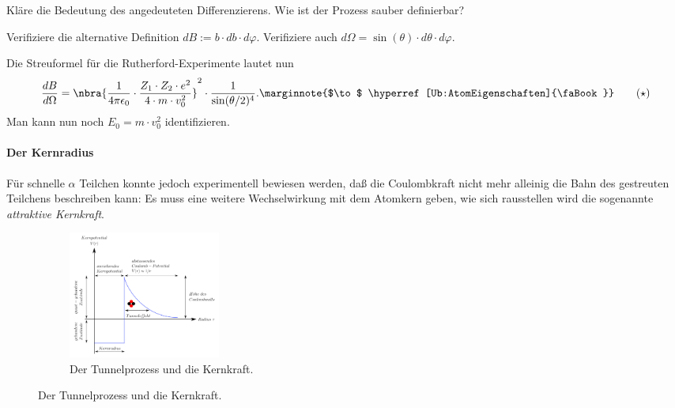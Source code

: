 \documentclass{subfiles}
\begin{document}
    \begin{Aufgabe}
        \nr{} Kläre die Bedeutung des angedeuteten Differenzierens. Wie ist der Prozess sauber definierbar?

        \nr{} Verifiziere die alternative Definition $dB:=b\cdot db\cdot d\varphi$. Verifiziere auch $d\Omega=\sin(\theta) \cdot d\theta\cdot d\varphi$. 
    \end{Aufgabe}

    \noindent Die Streuformel für die Rutherford-Experimente lautet nun
    \begin{align}
        \frac{dB}{d\Omega} = \nbra{\frac{1}{4\pi\epsilon_0}\cdot\frac{Z_1\cdot Z_2\cdot e^2}{4\cdot m\cdot v_0^2}}^2 \cdot \frac{1}{\sin(\theta/2)^4}.\label{Ub:RutherfordStreuformel}\marginnote{$\to$ \hyperref[Ub:AtomEigenschaften]{\faBook}}\tag{$\star$}
    \end{align}
    Man kann nun noch $E_0=m\cdot v_0^2$ identifizieren. 

    \paragraph*{Der Kernradius}\label{Ub:starkeKernkraft}
        Für schnelle $\alpha$ Teilchen konnte jedoch experimentell bewiesen werden, daß die Coulombkraft nicht mehr alleinig die Bahn des gestreuten Teilchens beschreiben kann: Es muss eine weitere Wechselwirkung mit dem Atomkern geben, wie sich rausstellen wird die sogenannte \emph{attraktive Kernkraft}.
        \begin{figure}[H]
            \centering
            \begin{subfigure}[b]{0.4\textwidth}
                \centering
                \includegraphics[width=5cm]{Bilddateien/1200px-Tunneleffekt_alpha_zerfall.svg.png}
                \caption{Der Tunnelprozess und die Kernkraft.}
            \end{subfigure}
        \end{figure}
\end{document}
